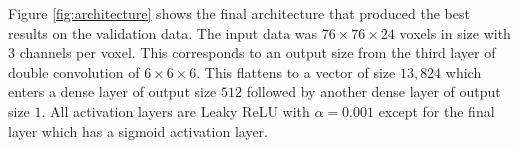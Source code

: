 Figure \ref{fig:architecture} shows the final architecture that produced the best results on the validation data. 
The input data was $76 \times 76 \times 24$ voxels in size with $3$ channels per voxel. 
This corresponds to an output size from the third layer of double convolution of $6 \times 6 \times 6$. 
This flattens to a vector of size $13,824$ which enters a dense layer of output size $512$ followed by another dense layer of output size $1$. 
All activation layers are Leaky ReLU with $\alpha=0.001$ except for the final layer which has a sigmoid activation layer.